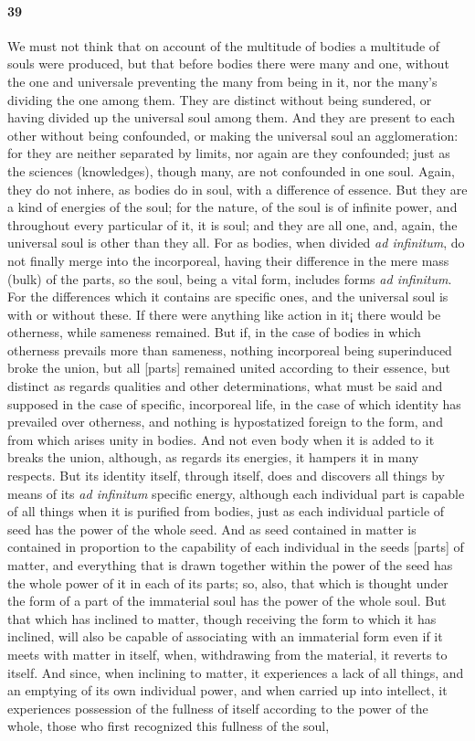 \documentclass{article}
\begin{document}
\paragraph{39} We must not think that on account of the multitude of bodies a multitude of souls were produced, but that before bodies there were many and one, without the one and universale preventing the many from being in it, nor the many’s dividing the one among them. They are distinct without being sundered, or having divided up the universal soul among them. And they are present to each other without being confounded, or making the universal soul an agglomeration: for they are neither separated by limits, nor again are they confounded; just as the sciences (knowledges), though many, are not confounded in one soul. Again, they do not inhere, as bodies do in soul, with a difference of essence. But they are a kind of energies of the soul; for the nature, of the soul is of infinite power, and throughout every particular of it, it is soul; and they are all one, and, again, the universal soul is other than they all. For as bodies, when divided \textit{ad infinitum}, do not finally merge into the incorporeal, having their difference in the mere mass (bulk) of the parts, so the soul, being a vital form, includes forms \textit{ad infinitum}. For the differences which it contains are specific ones, and the universal soul is with or without these. If there were anything like action in it¡ there would be otherness, while sameness remained. But if, in the case of bodies in which otherness prevails more than sameness, nothing incorporeal being superinduced broke the union, but all [parts] remained united according to their essence, but distinct as regards qualities and other determinations, what must be said and supposed in the case of specific, incorporeal life, in the case of which identity has prevailed over otherness, and nothing is hypostatized foreign to the form, and from which arises unity in bodies. And not even body when it is added to it breaks the union, although, as regards its energies, it hampers it in many respects. But its identity itself, through itself, does and discovers all things by means of its \textit{ad infinitum} specific energy, although each individual part is capable of all things when it is purified from bodies, just as each individual particle of seed has the power of the whole seed. And as seed contained in matter is contained in proportion to the capability of each individual in the seeds [parts] of matter, and everything that is drawn together within the power of the seed has the whole power of it in each of its parts; so, also, that which is thought under the form of a part of the immaterial soul has the power of the whole soul. But that which has inclined to matter, though receiving the form to which it has inclined, will also be capable of associating with an immaterial form even if it meets with matter in itself, when, withdrawing from the material, it reverts to itself. And since, when inclining to matter, it experiences a lack of all things, and an emptying of its own individual power, and when carried up into intellect, it experiences possession of the fullness of itself according to the power of the whole, those who first recognized this fullness of the soul, 
\end{document}
